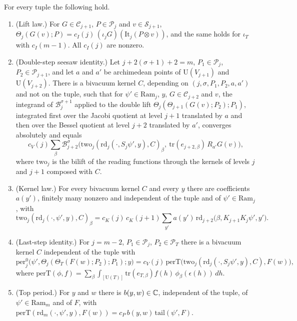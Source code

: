 \begin{hypothesis}\label{w2:see:H-laws}
For every tuple the following hold.
\begin{enumerate}[label=(T\arabic*),leftmargin=*]
\item\label{w2:see:T1} (Lift law.) For $G\in\mathcal C_{j+1}$, $P\in\mathcal P_j$ and $v\in\mathcal S_{j+1}$, $\Theta_j(G(v);P)=c_I(j)\,(\iota_jG)(\mathrm{It}_j(P\otimes v))$, and the same holds for $\iota_T$ with $c_I(m-1)$. All $c_I(j)$ are nonzero.
\item\label{w2:see:T2} (Double-step seesaw identity.) Let $j+2(\sigma+1)+2=m$, $P_1\in\mathcal P_j$, $P_2\in\mathcal P_{j+1}$, and let $a$ and $a'$ be archimedean points of $\mathrm U(V_{j+1})$ and $\mathrm U(V_{j+2})$. There is a bivacuum kernel $C$, depending on $(j,\sigma,P_1,P_2,a,a')$ and not on the tuple, such that for $\psi'\in\mathrm{Ram}_j$, $y$, $G\in\mathcal C_{j+2}$ and $v$, the integrand of $\mathcal B^{\sigma+1}_j$ applied to the double lift $\Theta_j(\Theta_{j+1}(G(v);P_2);P_1)$, integrated first over the Jacobi quotient at level $j+1$ translated by $a$ and then over the Bessel quotient at level $j+2$ translated by $a'$, converges absolutely and equals
\[
c_V(j)\sum_{\beta}\mathcal B^\sigma_{j+2}\bigl(\mathrm{two}_j(\mathrm{rd}_j(\cdot,S_j\psi',y),C)_\beta,\ \mathrm{tr}(e_{j+2,\beta})\,R_{a'}G(v)\bigr),
\]
where $\mathrm{two}_j$ is the bilift of the reading functions through the kernels of levels $j$ and $j+1$ composed with $C$.
\item\label{w2:see:T3} (Kernel law.) For every bivacuum kernel $C$ and every $y$ there are coefficients $a(y')$, finitely many nonzero and independent of the tuple and of $\psi'\in\mathrm{Ram}_j$, with
\[
\mathrm{two}_j(\mathrm{rd}_j(\cdot,\psi',y),C)_\beta=c_K(j)\,c_K(j+1)\sum_{y'}a(y')\,\mathrm{rd}_{j+2}\bigl(\beta,K_{j+1}K_j\psi',y'\bigr).
\]
\item\label{w2:see:T4} (Last-step identity.) For $j=m-2$, $P_1\in\mathcal P_j$, $P_2\in\mathcal P_T$ there is a bivacuum kernel $C$ independent of the tuple with
\[
\mathrm{per}^0_j\bigl(\psi',\Theta_j(\Theta_T(F(w);P_2);P_1);y\bigr)=c_V(j)\,\mathrm{perT}\bigl(\mathrm{two}_j(\mathrm{rd}_j(\cdot,S_j\psi',y),C),F(w)\bigr),
\]
where $\mathrm{perT}(\phi,f)=\sum_\beta\int_{[\mathrm U(T)]}\mathrm{tr}(e_{T,\beta})f(h)\,\phi_\beta(\epsilon(h))\,dh$.
\item\label{w2:see:T5} (Top period.) For $y$ and $w$ there is $b(y,w)\in\mathbb C$, independent of the tuple, of $\psi'\in\mathrm{Ram}_m$ and of $F$, with $\mathrm{perT}(\mathrm{rd}_m(\cdot,\psi',y),F(w))=c_P\,b(y,w)\,\mathrm{tail}(\psi',F)$.

\end{enumerate}
\end{hypothesis}
